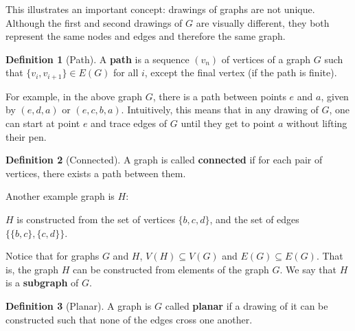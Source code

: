 \documentclass{scrippsthesisclass}
\theoremstyle{definition}
\newtheorem{defn}{Definition}[section]
\begin{document}
This illustrates an important concept: drawings of graphs are not unique. 
Although the first and second drawings of $G$ are visually different, they both represent the same nodes and edges and therefore the same graph.

\begin{defn}[Path]
    A \textbf{path} is a sequence $(v_n)$ of vertices of a graph $G$ such that $\{v_i, v_{i+1}\} \in E(G)$ for all $i$, except the final vertex (if the path is finite).
\end{defn}

For example, in the above  graph $G$, there is a path between points $e$ and $a$, given by $(e, d, a)$ or $(e, c, b, a)$.
Intuitively, this means that in any drawing of $G$, one can  start at point $e$ and trace edges of $G$ until they get to point $a$ without lifting their pen. 

\begin{defn}[Connected]
    A graph is called \textbf{connected} if for each pair of vertices, there exists a path between them. 
\end{defn}

Another example graph is $H$:
\begin{center}
\end{center}
$H$ is constructed from the set of vertices $\{b, c, d\}$, and the set of edges $\{\{b, c\}, \{c, d\}\}$. 

Notice that for graphs $G$ and $H$, $V(H) \subseteq V(G)$ and $E(G) \subseteq E(G)$.
That is, the graph $H$ can be constructed from elements of the graph $G$. 
We say that $H$ is a \textbf{subgraph} of $G$. 

\begin{defn}[Planar]
    A graph is $G$ called \textbf{planar} if a drawing of it can be constructed such that none of the edges cross one another.
\end{defn}
\end{document}
